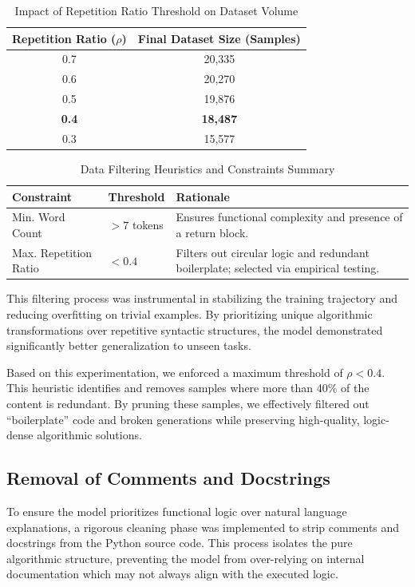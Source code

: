 \begin{table}[H]
    \centering
    \caption{Impact of Repetition Ratio Threshold on Dataset Volume}
    \label{tab:rep_ratio_exp}
    \begin{tabular}{cc}
        \toprule
        \textbf{Repetition Ratio ($\rho$)} & \textbf{Final Dataset Size (Samples)} \\
        \midrule
        0.7 & 20,335 \\
        0.6 & 20,270 \\
        0.5 & 19,876 \\
        \textbf{0.4} & \textbf{18,487} \\
        0.3 & 15,577 \\
        \bottomrule
    \end{tabular}
\end{table}

\begin{table}[H]
    \centering
    \caption{Data Filtering Heuristics and Constraints Summary}
    \label{tab:filtering_heuristics}
    \begin{tabular}{lp{2cm}p{7cm}}
        \toprule
        \textbf{Constraint} & \textbf{Threshold} & \textbf{Rationale} \\
        \midrule
        Min. Word Count & $> 7$ tokens & Ensures functional complexity and presence of a return block. \\
        Max. Repetition Ratio & $< 0.4$ & Filters out circular logic and redundant boilerplate; selected via empirical testing. \\
        \bottomrule
    \end{tabular}
\end{table}

This filtering process was instrumental in stabilizing the training trajectory and reducing overfitting on trivial examples. By prioritizing unique algorithmic transformations over repetitive syntactic structures, the model demonstrated significantly better generalization to unseen tasks.

Based on this experimentation, we enforced a maximum threshold of $\rho < 0.4$. This heuristic identifies and removes samples where more than 40\% of the content is redundant. By pruning these samples, we effectively filtered out ``boilerplate'' code and broken generations while preserving high-quality, logic-dense algorithmic solutions. 

\subsection{Removal of Comments and Docstrings}
To ensure the model prioritizes functional logic over natural language explanations, a rigorous cleaning phase was implemented to strip comments and docstrings from the Python source code. This process isolates the pure algorithmic structure, preventing the model from over-relying on internal documentation which may not always align with the executed logic.

